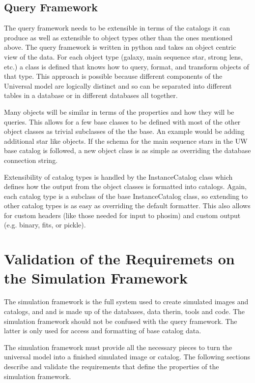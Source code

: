 \documentclass[]{article}
\begin{document}
\subsection{Query Framework}
The query framework needs to be extensible in terms of the catalogs it can produce
as well as extensible to object types other than the ones mentioned above.  
The query framework is written in python and takes an object centric view of the 
data.  For each object type (galaxy, main sequence star, strong lens, etc.) a class
is defined that knows how to query, format, and transform objects of that type.  
This approach is possible because different components of the Universal model
are logically distinct and so can be separated into different tables in a database
or in different databases all together.

Many objects will be similar in terms of the properties and how they will be queries.
This allows for a few base classes to be defined with most of the other object
classes as trivial subclasses of the the base.  An example would be adding additional
star like objects.  If the schema for the main sequence stars in the UW base catalog
is followed, a new object class is as simple as overriding the database connection string.

Extensibility of catalog types is handled by the InstanceCatalog class which defines how
the output from the object classes is formatted into catalogs.  Again, each catalog
type is a subclass of the base InstanceCatalog class, so extending to other catalog
types is as easy as overriding the default formatter.  This also allows for custom headers
(like those needed for input to phosim) and custom output (e.g. binary, fits, or pickle).

\section{Validation of the Requiremets on the Simulation Framework}
The simulation framework is the full system used to create simulated images and catalogs,
and and is made up of the databases, data therin, tools and
code.  The simulation framework should not be confused with the query framework.  The
latter is only used for access and formatting of base catalog data.

The simulation framework must provide all the necessary pieces to turn the universal model
into a finished simulated image or catalog.  The following sections describe
and validate the requirements that define the properties of the simulation framework.
\end{document}
